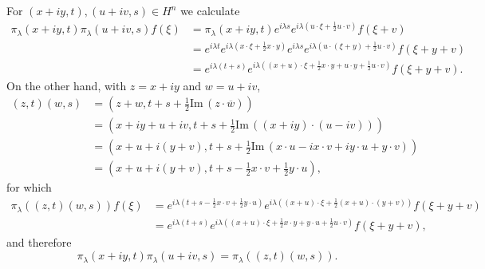 \documentclass{article}
\def\Im{\ensuremath{\mathrm{Im}}\,}
\theoremstyle{definition}
\theoremstyle{definition}
\begin{document}
For $(x+iy,t),(u+iv,s) \in H^n$ we calculate
\begin{align*}
\pi_\lambda (x+iy,t) \pi_\lambda(u+iv,s) f(\xi)&=\pi_\lambda(x+iy,t) e^{i\lambda s} e^{i\lambda\left(u\cdot \xi+\frac{1}{2}u \cdot v\right)}
f(\xi+v)\\
&=e^{i\lambda t} e^{i\lambda\left(x\cdot \xi+\frac{1}{2}x\cdot y\right)}
e^{i\lambda s} e^{i\lambda\left(u\cdot (\xi+y)+\frac{1}{2}u \cdot v\right)} f(\xi+y+v)\\
&=e^{i\lambda(t+s)} e^{i\lambda\left((x+u)\cdot \xi + \frac{1}{2}x\cdot y+u\cdot y+\frac{1}{2}u\cdot v\right)}
f(\xi+y+v).
\end{align*}
On the other hand, with $z=x+iy$ and $w=u+iv$,
\begin{align*}
(z,t)(w,s)&=\left(z+w,t+s+\frac{1}{2} \Im(z \cdot \overline{w})\right)\\
&=\left(x+iy+u+iv,t+s+\frac{1}{2}\Im((x+iy)\cdot (u-iv))\right)\\
&=\left(x+u+i(y+v),t+s+\frac{1}{2}\Im(x\cdot u - ix\cdot v + iy \cdot u + y \cdot v)\right)\\
&=\left(x+u+i(y+v),t+s-\frac{1}{2}x\cdot v + \frac{1}{2} y\cdot u \right),
\end{align*}
for which
\begin{align*}
\pi_\lambda((z,t)(w,s))f(\xi)&=e^{i\lambda\left(t+s-\frac{1}{2}x\cdot v + \frac{1}{2} y\cdot u\right)}
e^{i\lambda\left((x+u)\cdot \xi+\frac{1}{2}(x+u)\cdot (y+v) \right)} f(\xi+y+v)\\
&=e^{i\lambda(t+s)} e^{i\lambda\left((x+u)\cdot \xi+\frac{1}{2}x\cdot y+y \cdot u
+\frac{1}{2}u\cdot v\right)} f(\xi+y+v),
\end{align*}
and therefore
\[
\pi_\lambda (x+iy,t) \pi_\lambda(u+iv,s)  = \pi_\lambda((z,t)(w,s)).
\]
\end{document}
